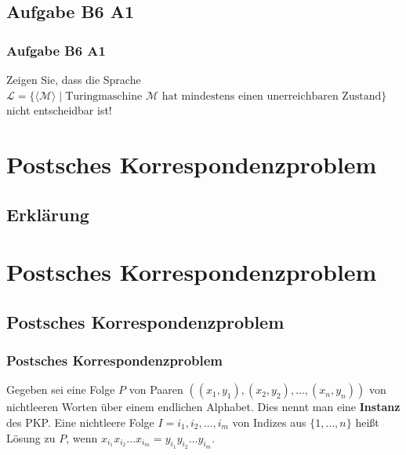 \subsection{Aufgabe B6 A1}
\begin{frame}
	\frametitle{Aufgabe B6 A1}
	Zeigen Sie, dass die Sprache \\ $\mathcal{L} = \{\langle\mathcal{M}\rangle \; | \; \mbox{Turingmaschine $\mathcal{M}$ hat mindestens einen unerreichbaren Zustand}\}$ \\ nicht entscheidbar ist!
\end{frame}

\section{Postsches Korrespondenzproblem}
\subsection{Erklärung}
\section{Postsches Korrespondenzproblem}
\subsection{Postsches Korrespondenzproblem}
\begin{frame}
\frametitle{Postsches Korrespondenzproblem}
Gegeben sei eine Folge $P$ von Paaren $((x_1, y_1), (x_2, y_2), \ldots, (x_n,y_n))$ von nichtleeren Worten über einem endlichen Alphabet. Dies nennt man eine \textbf{Instanz} des PKP.
Eine nichtleere Folge $I = i_1, i_2, \ldots, i_m$ von Indizes aus $\{1, \ldots, n\}$ heißt Lösung zu $P$, wenn $x_{i_1}x_{i_2}\ldots{}x_{i_m} = y_{i_1}y_{i_2}\ldots{}y_{i_m}$.
\end{frame}
